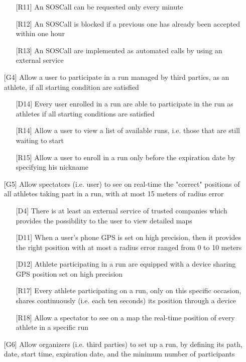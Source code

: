 \begin{itemize}
\begin{itemize}
	\item[{[R11]}] An SOSCall can be requested only every minute
	\item[{[R12]}] An SOSCall is blocked if a previous one has already been accepted within one hour
	\item[{[R13]}] An SOSCall are implemented as automated calls by using an external service
	\end{itemize}
\item[{[G4]}] Allow a user to participate in a run managed by third parties, as an athlete, if all starting condition are satisfied
	\begin{itemize}
	\item[{[D14]}] Every user enrolled in a run are able to participate in the run as athletes if all starting conditions are satisfied
	\item[{[R14]}] Allow a user to view a list of available runs, i.e. those that are still waiting to start 
	\item[{[R15]}] Allow a user to enroll in a run only before the expiration date by specifying his nickname
	\end{itemize}
\item[{[G5]}] Allow spectators (i.e. user) to see on real-time the "correct" positions of all athletes taking part in a run, with at most 15 meters of radius error
	\begin{itemize}
	\item[{[D4]}] There is at least an external service of trusted companies which provides the possibility to the user to view detailed maps
	\item[{[D11]}] When a user's phone GPS is set on high precision, then it provides the right position with at most a radius error ranged from 0 to 10 meters
	\item[{[D12]}] Athlete participating in a run are equipped with a device sharing GPS position set on high precision
	\item[{[R17]}] Every athlete participating on a run, only on this specific occasion, shares continuously (i.e. each ten seconds) its position through a device
	\item[{[R18]}] Allow a spectator to see on a map the real-time position of every athlete in a specific run
	\end{itemize}
\item[{[G6]}] Allow organizers (i.e. third parties) to set up a run, by defining its path, date, start time, expiration date, and the minimum number of participants
	\begin{itemize}

\end{itemize}
\end{itemize}
